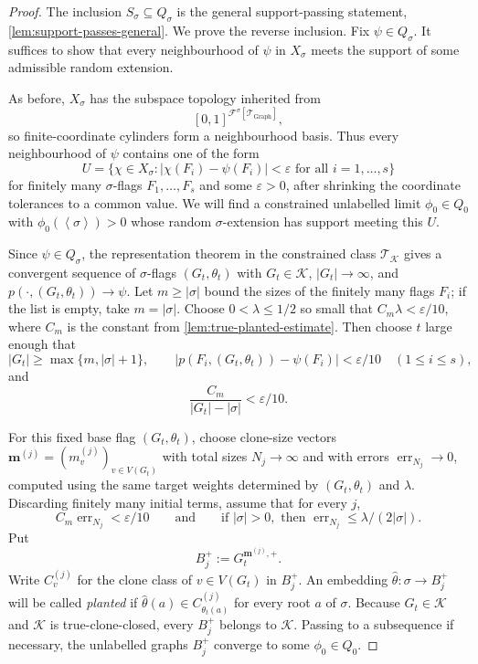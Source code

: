 \documentclass[11pt]{article}
\theoremstyle{definition}
\newcommand{\F}{\mathcal{F}}
\newcommand{\K}{\mathcal{K}}
\newcommand{\T}{\mathcal{T}}
\newcommand{\brak}[1]{\left\langle #1\right\rangle}
\newcommand{\eps}{\varepsilon}
\begin{document}
\begin{proof}
The inclusion $S_\sigma\subseteq Q_\sigma$ is the general support-passing
statement, \cref{lem:support-passes-general}.  We prove the reverse inclusion.
Fix $\psi\in Q_\sigma$.  It suffices to show that every neighbourhood of $\psi$
in $X_\sigma$ meets the support of some admissible random extension.

As before, $X_\sigma$ has the subspace topology inherited from
\[
  [0,1]^{\F^\sigma[\T_{\mathrm{Graph}}]},
\]
so finite-coordinate cylinders form a neighbourhood basis.  Thus every
neighbourhood of $\psi$ contains one of the form
\[
  U=
  \{\chi\in X_\sigma:
    |\chi(F_i)-\psi(F_i)|<\eps\text{ for all }i=1,\ldots,s\}
\]
for finitely many $\sigma$-flags $F_1,\ldots,F_s$ and some $\eps>0$, after
shrinking the coordinate tolerances to a common value.  We will find a
constrained unlabelled limit $\phi_0\in Q_0$ with $\phi_0(\brak\sigma)>0$ whose
random $\sigma$-extension has support meeting this $U$.

Since $\psi\in Q_\sigma$, the representation theorem in the constrained class
$\T_\K$ gives a convergent sequence of $\sigma$-flags
$(G_t,\theta_t)$ with $G_t\in\K$, $|G_t|\to\infty$, and
$p(\cdot,(G_t,\theta_t))\to\psi$.  Let $m\ge|\sigma|$ bound the sizes of the
finitely many flags $F_i$; if the list is empty, take $m=|\sigma|$.  Choose
$0<\lambda\le1/2$ so small that $C_m\lambda<\eps/10$, where $C_m$ is the
constant from \cref{lem:true-planted-estimate}.  Then choose $t$ large enough
that
\[
  |G_t|\ge\max\{m,|\sigma|+1\},\qquad
  |p(F_i,(G_t,\theta_t))-\psi(F_i)|<\eps/10\quad(1\le i\le s),
\]
and
\[
  \frac{C_m}{|G_t|-|\sigma|}<\eps/10 .
\]

For this fixed base flag $(G_t,\theta_t)$, choose clone-size vectors
$\mathbf m^{(j)}=(m_v^{(j)})_{v\in V(G_t)}$ with total sizes $N_j\to\infty$ and
with errors $\operatorname{err}_{N_j}\to0$, computed using the same target
weights determined by $(G_t,\theta_t)$ and $\lambda$.  Discarding finitely many
initial terms, assume that for every $j$,
\[
  C_m\operatorname{err}_{N_j}<\eps/10
  \qquad\text{and}\qquad
  \text{if }|\sigma|>0,\text{ then }
  \operatorname{err}_{N_j}\le\lambda/(2|\sigma|).
\]
Put
\[
  B_j^+:=G_t^{\mathbf m^{(j)},+}.
\]
Write $C_v^{(j)}$ for the clone class of $v\in V(G_t)$ in $B_j^+$.  An embedding
$\widehat\theta:\sigma\to B_j^+$ will be called \emph{planted} if
$\widehat\theta(a)\in C_{\theta_t(a)}^{(j)}$ for every root $a$ of
$\sigma$.
Because $G_t\in\K$ and $\K$ is true-clone-closed, every $B_j^+$ belongs to
$\K$.  Passing to a subsequence if necessary, the unlabelled graphs $B_j^+$
converge to some $\phi_0\in Q_0$.


\end{proof}
\end{document}
